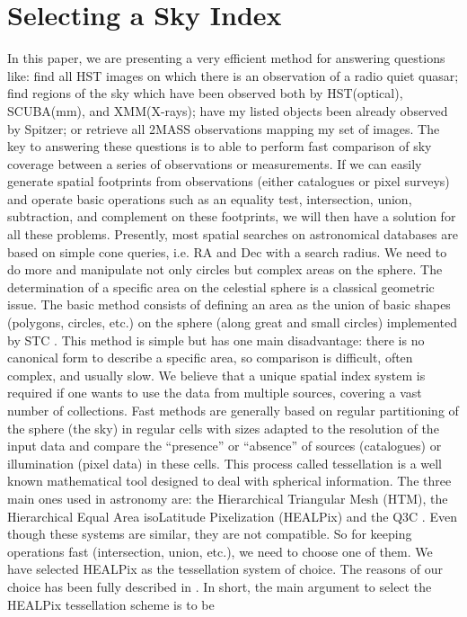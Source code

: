 \section{Selecting a Sky Index}
In this paper, we are presenting a very efficient method for answering questions like: find all HST images on which there is an observation of a radio quiet quasar; find regions of the sky which have been observed both by HST(optical), SCUBA(mm), and XMM(X-rays); have my listed objects been already observed by Spitzer; or retrieve all 2MASS observations mapping my set of images. The key to answering these questions is to able to perform fast comparison of sky coverage between a series of observations or measurements. If we can easily generate spatial footprints from observations (either catalogues or pixel surveys) and operate basic operations such as an equality test, intersection, union, subtraction, and complement on these footprints, we will then have a solution for all these problems. Presently, most spatial searches on astronomical databases are based on simple cone queries, i.e. RA and Dec with a search radius. We need to do more and manipulate not only circles but complex areas on the sphere. The determination of a specific area on the celestial sphere is a classical geometric issue. The basic method consists of defining an area as the union of basic shapes (polygons, circles, etc.) on the sphere (along great and small circles) implemented by STC \citep{STC}. This method is simple but has one main disadvantage: there is no canonical form to describe a specific area, so comparison is difficult, often complex, and usually slow. We believe that a unique spatial index system is required if one wants to use the data from multiple sources, covering a vast number of collections. Fast methods are generally based on regular partitioning of the sphere (the sky) in regular cells with sizes adapted to the resolution of the input data and compare the ``presence'' or ``absence'' of sources (catalogues) or illumination (pixel data) in these cells. This process called tessellation is a well known mathematical tool designed to deal with spherical information. The three main ones used in astronomy are: the Hierarchical Triangular Mesh \cite{HTM} (HTM), the Hierarchical Equal Area isoLatitude Pixelization \citep{Healpix} (HEALPix) and the Q3C \citep{quadtreee}. Even though these systems are similar, they are not compatible. So for keeping operations fast (intersection, union, etc.), we need to choose one of them. We have selected HEALPix as the tessellation system of choice. The reasons of our choice has been fully described in  \citep{Fernique}. In short, the main argument to select the HEALPix tessellation scheme is to be 